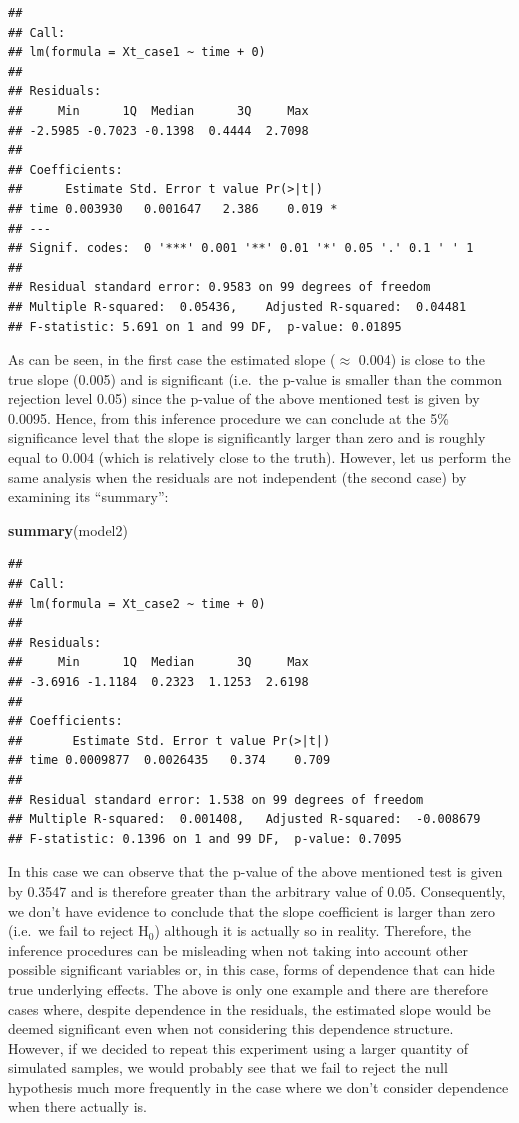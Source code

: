 \documentclass[]{book}
\newenvironment{Shaded}{\begin{snugshade}}{\end{snugshade}}
\newcommand{\KeywordTok}[1]{\textcolor[rgb]{0.13,0.29,0.53}{\textbf{#1}}}
\newcommand{\NormalTok}[1]{#1}
\theoremstyle{definition}
\theoremstyle{definition}
\theoremstyle{definition}
\theoremstyle{remark}
\begin{document}
\begin{verbatim}
## 
## Call:
## lm(formula = Xt_case1 ~ time + 0)
## 
## Residuals:
##     Min      1Q  Median      3Q     Max 
## -2.5985 -0.7023 -0.1398  0.4444  2.7098 
## 
## Coefficients:
##      Estimate Std. Error t value Pr(>|t|)  
## time 0.003930   0.001647   2.386    0.019 *
## ---
## Signif. codes:  0 '***' 0.001 '**' 0.01 '*' 0.05 '.' 0.1 ' ' 1
## 
## Residual standard error: 0.9583 on 99 degrees of freedom
## Multiple R-squared:  0.05436,    Adjusted R-squared:  0.04481 
## F-statistic: 5.691 on 1 and 99 DF,  p-value: 0.01895
\end{verbatim}

As can be seen, in the first case the estimated slope (\(\approx\)
0.004) is close to the true slope (0.005) and is significant (i.e.~the
p-value is smaller than the common rejection level 0.05) since the
p-value of the above mentioned test is given by 0.0095. Hence, from this
inference procedure we can conclude at the 5\% significance level that
the slope is significantly larger than zero and is roughly equal to
0.004 (which is relatively close to the truth). However, let us perform
the same analysis when the residuals are not independent (the second
case) by examining its ``summary'':

\begin{Shaded}
\begin{Highlighting}[]
\KeywordTok{summary}\NormalTok{(model2)}
\end{Highlighting}
\end{Shaded}

\begin{verbatim}
## 
## Call:
## lm(formula = Xt_case2 ~ time + 0)
## 
## Residuals:
##     Min      1Q  Median      3Q     Max 
## -3.6916 -1.1184  0.2323  1.1253  2.6198 
## 
## Coefficients:
##       Estimate Std. Error t value Pr(>|t|)
## time 0.0009877  0.0026435   0.374    0.709
## 
## Residual standard error: 1.538 on 99 degrees of freedom
## Multiple R-squared:  0.001408,   Adjusted R-squared:  -0.008679 
## F-statistic: 0.1396 on 1 and 99 DF,  p-value: 0.7095
\end{verbatim}

In this case we can observe that the p-value of the above mentioned test
is given by 0.3547 and is therefore greater than the arbitrary value of
0.05. Consequently, we don't have evidence to conclude that the slope
coefficient is larger than zero (i.e.~we fail to reject H\(_0\))
although it is actually so in reality. Therefore, the inference
procedures can be misleading when not taking into account other possible
significant variables or, in this case, forms of dependence that can
hide true underlying effects. The above is only one example and there
are therefore cases where, despite dependence in the residuals, the
estimated slope would be deemed significant even when not considering
this dependence structure. However, if we decided to repeat this
experiment using a larger quantity of simulated samples, we would
probably see that we fail to reject the null hypothesis much more
frequently in the case where we don't consider dependence when there
actually is.
\end{document}
